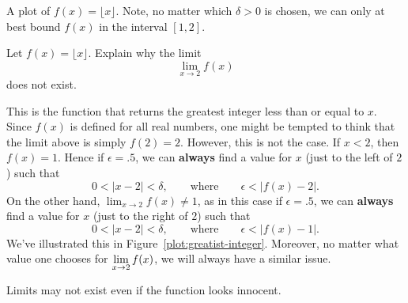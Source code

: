 \begin{marginfigure}[2in]
\caption{A plot of $f(x)=\lfloor x\rfloor$. Note, no matter which
  $\delta>0$ is chosen, we can only at best bound $f(x)$ in the
  interval $[1,2]$.}
\label{plot:greatist-integer}
\end{marginfigure}


\begin{example}
Let $f(x) = \lfloor x\rfloor$. Explain why the limit
\[
\lim_{x\to 2} f(x)
\]
does not exist.
\end{example}
\begin{solution}
This is the function that returns the greatest integer less than or
equal to $x$. Since $f(x)$ is defined for all real numbers, one might
be tempted to think that the limit above is simply $f(2) =
2$. However, this is not the case.  If $x<2$, then $f(x) =1$. Hence if
$\epsilon = .5$, we can \textbf{always} find a value for $x$ (just to
the left of $2$) such that
\[
0< |x -2|< \delta, \qquad\text{where} \qquad \epsilon < |f(x)-2|.
\]
On the other hand, $\lim_{x\to 2} f(x)\ne 1$, as in this case if
$\epsilon=.5$, we can \textbf{always} find a value for $x$ (just to
the right of $2$) such that
\[
0<|x- 2|<\delta, \qquad\text{where} \qquad  \epsilon<|f(x)-1|.
\]
We've illustrated this in
Figure~\ref{plot:greatist-integer}. Moreover, no matter what value one
chooses for $\displaystyle \lim_{x\to 2} f(x)$, we will always have a similar
issue.
\end{solution}



Limits may not exist even if the function looks innocent. 


